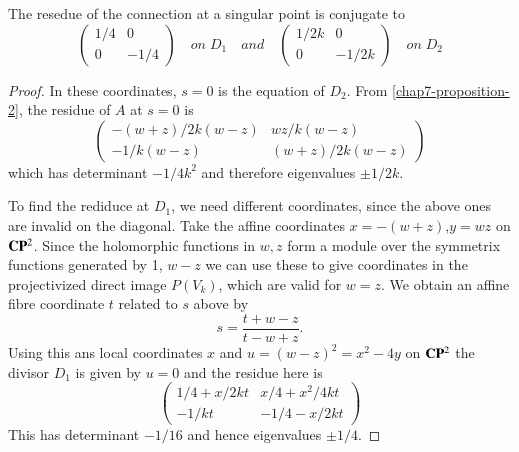\begin{proposition}\label{chap7-proposition-4}
The resedue of the connection at a singular point is conjugate to
$$
\left(
\begin{matrix}
1/4 & 0\\
0 & -1/4
\end{matrix}
\right)
\quad 
on\; D_{1} \quad and \quad
\left(
\begin{matrix}
1/2k & 0\\
0 & -1/2k
\end{matrix}
\right)
\quad on \; D_{2}
$$
\end{proposition}

 \begin{proof}
In these coordinates, $s=0$ is the equation of $D_{2}$. From \eqref{chap7-proposition-2}, the residue of $A$ at $s=0$ is
\begin{equation*}\label{chap7-eq-13}
\left(
\begin{matrix}
-(w+z)/2k(w-z) & wz/k(w-z)\\
-1/k(w-z) & (w+z)/2k(w-z)
\end{matrix}
\right)\tag{13}
\end{equation*}
which has determinant $-1/4k^{2}$ and therefore eigenvalues $\pm1/2k$.

To find the rediduce at $D_{1}$, we need different coordinates, since the above ones are invalid on the diagonal. Take the affine coordinates $x=-(w+z)$,\pageoriginale $y=wz$ on $\mathbf{C}\mathbf{P}^{2}$. Since the holomorphic functions in $w, z$ form a module over the symmetrix functions generated by 1, $w -z$ we can use these to give  coordinates in the projectivized direct image $P(V_{k})$, which are valid for $w=z$. We obtain an affine fibre coordinate $t$ related to $s$ above by
$$
s = \dfrac{t+w-z}{t-w+z}.
$$
Using this ans local coordinates $x$ and  $u= (w-z)^{2} =x^{2}-4y$ on $\mathbf{C}\mathbf{P}^{2}$ the divisor $D_{1}$ is given by $u=0$ and the residue here is
\begin{equation*}\label{chap7-eq-14}
\left(
\begin{matrix}
1/4+x/2kt & x/4+x^{2}/4kt\\
-1/kt & -1/4-x/2kt
\end{matrix}
\right)\tag{14}
\end{equation*}
This has determinant $-1/16$ and hence eigenvalues $\pm1/4$.
 \end{proof}

